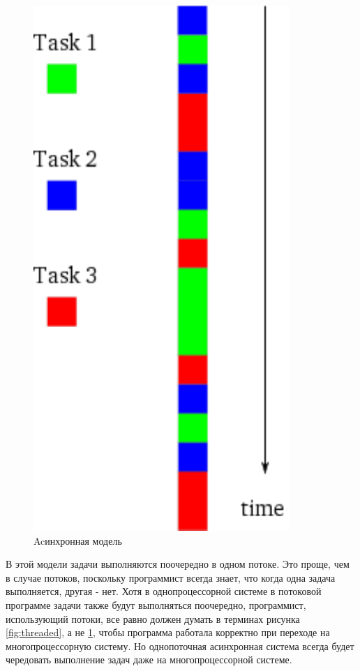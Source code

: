 \begin{figure}[h]
\begin{center}
    \includegraphics[height=0.3\textheight]{images/async.pdf}
\end{center}
    \caption{Acинхронная модель\label{fig:async}}
\end{figure}

В этой модели задачи выполняются поочередно в одном потоке. 
Это проще, чем в случае потоков, поскольку программист всегда знает, что
когда одна задача выполняется, другая - нет. Хотя в однопроцессорной системе
в потоковой программе задачи также будут выполняться поочередно, программист,
использующий потоки, все равно должен думать в терминах рисунка \ref{fig:threaded},
а не \ref{fig:async}, чтобы программа работала корректно при переходе
на многопроцессорную систему. Но однопоточная асинхронная система всегда
будет чередовать выполнение задач даже на многопроцессорной системе.


